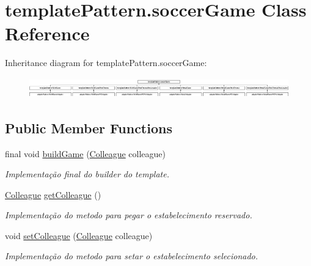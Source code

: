 \hypertarget{classtemplate_pattern_1_1soccer_game}{}\section{template\+Pattern.\+soccer\+Game Class Reference}
\label{classtemplate_pattern_1_1soccer_game}
Inheritance diagram for template\+Pattern.\+soccer\+Game\+:\begin{figure}[H]
\begin{center}
\leavevmode
\includegraphics[height=0.894569cm]{classtemplate_pattern_1_1soccer_game}
\end{center}
\end{figure}
\subsection*{Public Member Functions}
\begin{DoxyCompactItemize}
\item 
final void \mbox{\hyperlink{classtemplate_pattern_1_1soccer_game_a59ff3d4747285f938a4d290c2864ab55}{build\+Game}} (\mbox{\hyperlink{classmediator_pattern_1_1_colleague}{Colleague}} colleague)
\begin{DoxyCompactList}\small\item\em Implementação final do builder do template. \end{DoxyCompactList}\item 
\mbox{\hyperlink{classmediator_pattern_1_1_colleague}{Colleague}} \mbox{\hyperlink{classtemplate_pattern_1_1soccer_game_a4f66a5d39bca540b9606547a58aa568a}{get\+Colleague}} ()
\begin{DoxyCompactList}\small\item\em Implementação do metodo para pegar o estabelecimento reservado. \end{DoxyCompactList}\item 
void \mbox{\hyperlink{classtemplate_pattern_1_1soccer_game_a9fc248b70ca24460d572bc427ee19d3f}{set\+Colleague}} (\mbox{\hyperlink{classmediator_pattern_1_1_colleague}{Colleague}} colleague)
\begin{DoxyCompactList}\small\item\em Implementação do metodo para setar o estabelecimento selecionado. \end{DoxyCompactList}\end{DoxyCompactItemize}


